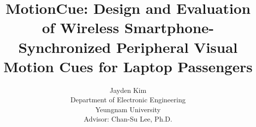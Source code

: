 \documentclass[10pt,twocolumn,letterpaper]{article}
\title{MotionCue: Design and Evaluation of Wireless Smartphone-Synchronized Peripheral Visual Motion Cues for Laptop Passengers}
\author{Jayden Kim\\
Department of Electronic Engineering\\
Yeungnam University\\
{\small Advisor: Chan-Su Lee, Ph.D.}
}
\begin{document}
\maketitle











{\small


}
\end{document}
